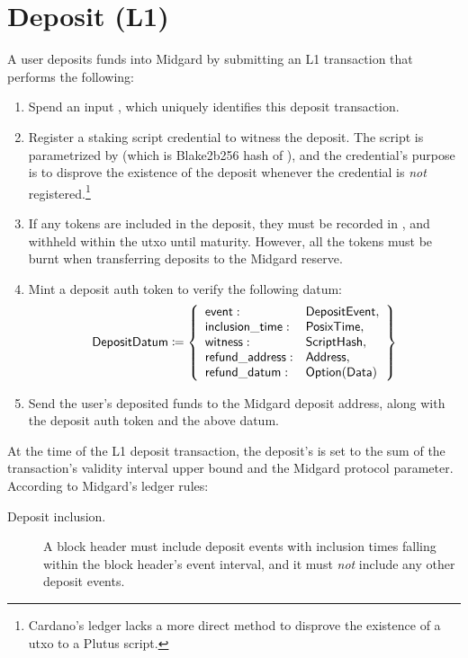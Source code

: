\documentclass[../midgard.tex]{subfiles}
\begin{document}
\section{Deposit (L1)}
\label{h:deposit}

A user deposits funds into Midgard by submitting an L1 transaction that performs the following:
\begin{enumerate}
    \item Spend an input , which uniquely identifies this deposit transaction.
    \item Register a staking script credential to witness the deposit.
      The script is parametrized by  (which is Blake2b256 hash of ), and the credential's purpose is to disprove the existence of the deposit whenever the credential is \emph{not} registered.\footnote{Cardano's ledger lacks a more direct method to disprove the existence of a utxo to a Plutus script.}
    \item If any tokens are included in the deposit, they must be recorded in , and withheld within the utxo until maturity. However, all the tokens must be burnt when transferring deposits to the Midgard reserve.
    \item Mint a deposit auth token to verify the following datum:
        \begin{equation*}
        \mathsf{DepositDatum} \coloneq \left\{
            \begin{array}{ll}
                \mathsf{event} : & \mathsf{DepositEvent}, \\
                \mathsf{inclusion\_time} : & \mathsf{PosixTime}, \\
                \mathsf{witness} : & \mathsf{ScriptHash}, \\
                \mathsf{refund\_address}: & \mathsf{Address}, \\
                \mathsf{refund\_datum}: & \mathsf{Option(Data)}
            \end{array}
            \right\}
        \end{equation*}
    \item Send the user's deposited funds to the Midgard deposit address, along with the deposit auth token and the above datum.
\end{enumerate}

At the time of the L1 deposit transaction, the deposit's  is set to the sum of the transaction's validity interval upper bound and the  Midgard protocol parameter.
According to Midgard's ledger rules:
\begin{description}
    \item[Deposit inclusion.] A block header must include deposit events with inclusion times falling within the block header's event interval, and it must \emph{not} include any other deposit events.
\end{description}
\end{document}
